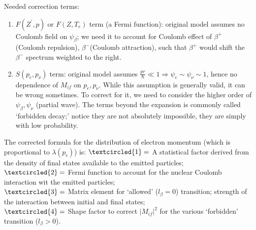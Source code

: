 \documentclass{school-22.101-notes}
\begin{document}
Needed correction terms: 
\begin{enumerate}
\item $F(Z^{\prime},p)$ or $F(Z,T_e)$ term (a Fermi function): original model assumes no Coulomb field on $\psi_{\beta}$; we need it to account for Coulomb effect of $\beta^+$ (Coulomb repulsion), $\beta^-$(Coulomb attraction), such that $\beta^+$ would shift the $\beta^-$ spectrum weighted to the right.
\item $S(p_e, p_{\nu})$ term: original model assumes $\frac{pr}{\hbar} \ll 1 \Rightarrow \psi_e \sim \psi_{\nu} \sim 1$, hence no dependence of $M_{if}$ on $p_e, p_{\nu}$. While this assumption is generally valid, it can be wrong sometimes. To correct for it, we need to consider the higher order of $\psi_{\beta}, \psi_{\nu}$ (partial wave). The terms beyond the expansion is commonly called `forbidden decay;' notice they are not absolutely impossible, they are simply with low probability. 
\end{enumerate}
The corrected formula for the distribution of electron momentum (which is proportional to $\lambda(p_e)$) is:
$\textcircled{1}=$ A statistical factor derived from the density of final states available to the emitted particles; \\
$\textcircled{2}=$ Fermi function to account for the nuclear Coulomb interaction wit the emitted particles;\\
$\textcircled{3}=$ Matrix element for `allowed' ($l_{\beta} = 0$) transition; strength of the interaction between initial and final states; \\
$\textcircled{4}=$ Shape factor to correct $|M_{if}|^2$ for the various `forbidden' transition ($l_{\beta} >0$). 
\end{document}
